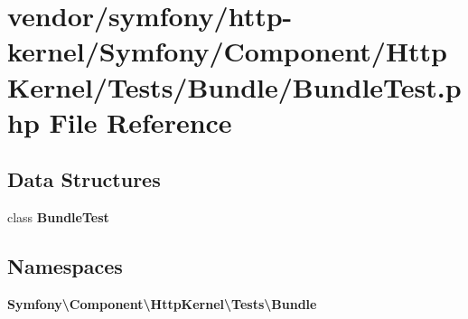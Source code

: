 \section{vendor/symfony/http-\/kernel/\+Symfony/\+Component/\+Http\+Kernel/\+Tests/\+Bundle/\+Bundle\+Test.php File Reference}
\label{_bundle_test_8php}
\subsection*{Data Structures}
\begin{DoxyCompactItemize}
\item 
class {\bf Bundle\+Test}
\end{DoxyCompactItemize}
\subsection*{Namespaces}
\begin{DoxyCompactItemize}
\item 
 {\bf Symfony\textbackslash{}\+Component\textbackslash{}\+Http\+Kernel\textbackslash{}\+Tests\textbackslash{}\+Bundle}
\end{DoxyCompactItemize}
